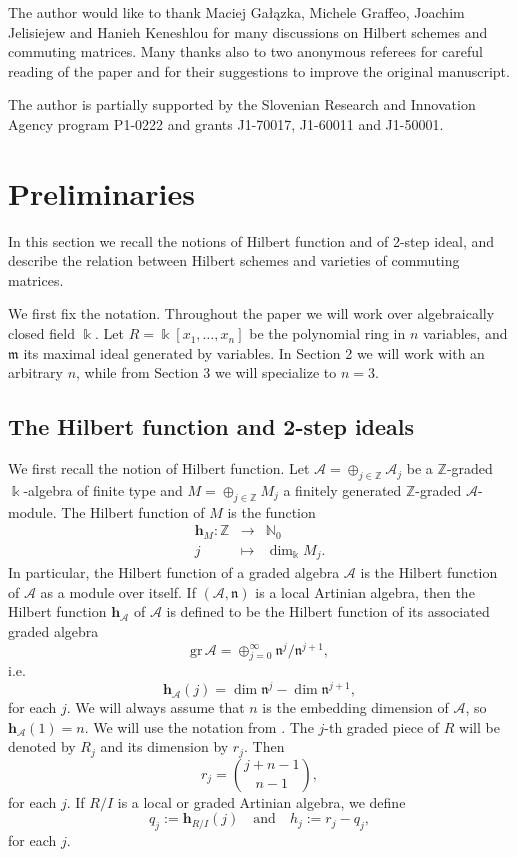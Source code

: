 \documentclass[11pt]{amsart}
\theoremstyle{definition}
\newcommand{\kk}{\Bbbk}
\newcommand{\ZZ}{\mathbb{Z}}
\newcommand{\NN}{\mathbb{N}}
\newcommand{\m}{\mathfrak{m}}
\newcommand{\h}{\mathbf{h}}
\newcommand{\cA}{\mathcal{A}}
\begin{document}
The author would like to thank Maciej Ga{\l}\k{a}zka, Michele Graffeo, Joachim Jelisiejew and Hanieh Keneshlou for many discussions on Hilbert schemes and commuting matrices. Many thanks also to two anonymous referees for careful reading of the paper and for their suggestions to improve the original manuscript.

The author is partially supported by the Slovenian Research and Innovation Agency program P1-0222 and grants J1-70017, J1-60011 and J1-50001.

\section{Preliminaries}

In this section we recall the notions of Hilbert function and of 2-step ideal, and describe the relation between Hilbert schemes and varieties of commuting matrices.

We first fix the notation. Throughout the paper we will work over algebraically closed field $\kk$. Let $R=\Bbbk[x_1,\ldots ,x_n]$ be the polynomial ring in $n$ variables, and $\m$ its maximal ideal generated by variables. In Section 2 we will work with an arbitrary $n$, while from Section 3 we will specialize to $n=3$.

\subsection{The Hilbert function and 2-step ideals}

We first recall the notion of Hilbert function. Let $\cA=\oplus_{j\in \ZZ}\cA_j$ be a $\ZZ$-graded $\Bbbk$-algebra of finite type and $M=\oplus_{j\in \ZZ}M_j$ a finitely generated $\ZZ$-graded $\cA$-module. The Hilbert function of $M$ is the function
\begin{eqnarray*}
\h_M\colon \ZZ&\to& \NN_0\\
j&\mapsto&\dim_{\Bbbk}M_j.
\end{eqnarray*}
In particular, the Hilbert function of a graded algebra $\cA$ is the Hilbert function of $\cA$ as a module over itself. If $(\cA,\mathfrak{n})$ is a local Artinian algebra, then the Hilbert function $\h_\cA$ of $\cA$ is defined to be the Hilbert function of its associated graded algebra
$$\mathrm{gr}\,  \cA=\oplus_{j=0}^{\infty}\mathfrak{n}^j/\mathfrak{n}^{j+1},$$
i.e.
$$\h_\cA(j)=\dim \mathfrak{n}^j-\dim \mathfrak{n}^{j+1},$$
for each $j$. We will always assume that $n$ is the embedding dimension of $\cA$, so $\h_\cA(1)=n$. We will use the notation from \cite{GGGL}. The $j$-th graded piece of $R$ will be denoted by $R_j$ and its dimension by $r_j$. Then
$$r_j={j+n-1\choose n-1},$$
for each $j$. If $R/I$ is a local or graded Artinian algebra, we define
$$q_j:=\h_{R/I}(j)\quad \mathrm{and}\quad h_j:=r_j-q_j,$$
for each $j$.
\end{document}

